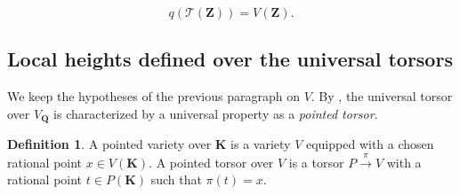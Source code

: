 \documentclass{proc-l}
\newcommand{\Z}{\mathbf{Z}}
\newcommand{\K}{\mathbf{K}}
\newcommand{\Q}{\mathbf{Q}}
\newcommand{\G}{\mathbf{G}}
\newcommand{\base}{\mathbf{b}}
\DeclareMathOperator{\Gal}{Gal}
\DeclareMathOperator{\Pic}{Pic}
\DeclareMathOperator{\rank}{rank}
\newcommand{\stackT}{\mathcal{T}}
\theoremstyle{definition}
\newtheorem{definition}[theorem]{Definition}
\theoremstyle{remark}
\newtheorem{question}[theorem]{Question}
\newtheorem*{Notations}{Notations}
\numberwithin{equation}{section}
\begin{document}
$$ q(\stackT(\Z)) = V(\Z) .$$













\subsection{Local heights defined over the universal torsors}



We keep the hypotheses of the previous paragraph on $V$. By \cite[remark 4.19]{Peyre_beyond_height}, the universal torsor over $V_{\Q}$ is characterized by a universal property as a \textit{pointed torsor}.

\begin{definition}
    A pointed variety over $\K$ is a variety $V$ equipped with a chosen rational point $x \in V(\K)$. A pointed torsor over $V$ is a torsor $P \xrightarrow{ \pi } V$ with a rational point $t \in P(\K)$ such that $\pi(t) = x$.
\end{definition}
\end{document}
